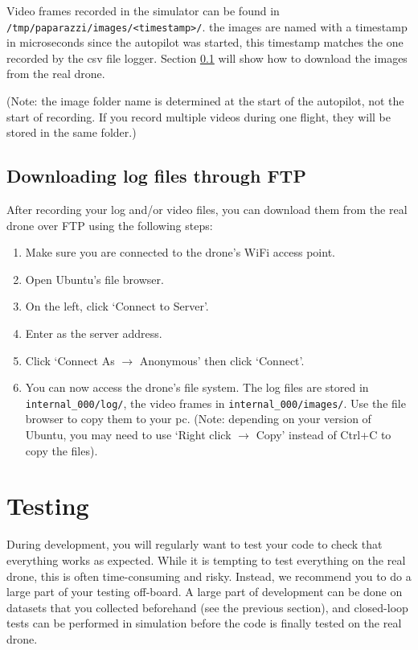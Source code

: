 \documentclass{article}
\begin{document}
Video frames recorded in the simulator can be found in \texttt{/tmp/paparazzi/images/<timestamp>/}. the images are named with a timestamp in microseconds since the autopilot was started, this timestamp matches the one recorded by the csv file logger. Section \ref{sec:ftp} will show how to download the images from the real drone.

(Note: the image folder name is determined at the start of the autopilot, not the start of recording. If you record multiple videos during one flight, they will be stored in the same folder.)


\subsection{Downloading log files through FTP}\label{sec:ftp}
After recording your log and/or video files, you can download them from the real drone over FTP using the following steps:
\begin{enumerate}
\item Make sure you are connected to the drone's WiFi access point.
\item Open Ubuntu's file browser.
\item On the left, click `Connect to Server'.
\item Enter  as the server address.
\item Click `Connect As $\rightarrow$ Anonymous' then click `Connect'.
\item You can now access the drone's file system. The log files are stored in \texttt{internal\_000/log/}, the video frames in \texttt{internal\_000/images/}. Use the file browser to copy them to your pc. (Note: depending on your version of Ubuntu, you may need to use `Right click $\rightarrow$ Copy' instead of Ctrl+C to copy the files).
\end{enumerate}



\section{Testing}
During development, you will regularly want to test your code to check that everything works as expected. While it is tempting to test everything on the real drone, this is often time-consuming and risky. Instead, we recommend you to do a large part of your testing off-board. A large part of development can be done on datasets that you collected beforehand (see the previous section), and closed-loop tests can be performed in simulation before the code is finally tested on the real drone.
\end{document}
